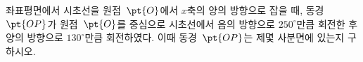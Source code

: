 좌표평면에서 시초선을 원점~$\pt{O}$에서 $x$축의 양의 방향으로 잡을 때, 동경~$\pt{OP}$가 원점~$\pt{O}$를 중심으로 시초선에서 음의 방향으로 $250^\circ$만큼 회전한 후 양의 방향으로 $130^\circ$만큼 회전하였다. 이때 동경~$\pt{OP}$는 제몇 사분면에 있는지 구하시오.
